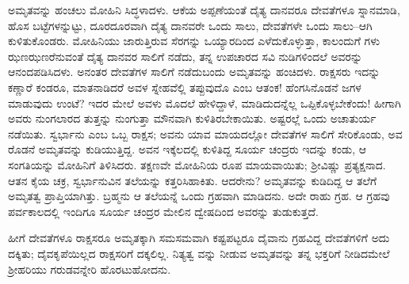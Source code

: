 ಅಮೃತವನ್ನು ಹಂಚಲು ಮೋಹಿನಿ ಸಿದ್ಧಳಾದಳು. ಆಕೆಯ ಅಪ್ಪಣೆಯಂತೆ ದೈತ್ಯ ದಾನವರೂ ದೇವತೆಗಳೂ ಸ್ನಾನಮಾಡಿ, ಹೊಸ ಬಟ್ಟೆಗಳನ್ನುಟ್ಟು, ದೂರದೂರವಾಗಿ ದೈತ್ಯ ದಾನವರೇ ಒಂದು ಸಾಲು, ದೇವತೆಗಳೇ ಒಂದು ಸಾಲು–ಆಗಿ ಕುಳಿತುಕೊಂಡರು. ಮೋಹಿನಿಯು ಜಾರುತ್ತಿರುವ ಸೆರಗನ್ನು ಒಯ್ಯಾರದಿಂದ ಎಳೆದುಕೊಳ್ಳುತ್ತಾ, ಕಾಲಂದುಗೆ ಗಳು ಝಣಝಣರೆನುವಂತೆ ದೈತ್ಯ ದಾನವರ ಸಾಲಿಗೆ ನಡೆದು, ತನ್ನ ಉಪಚಾರದ ಸವಿ ನುಡಿಗಳಿಂದಲೆ ಅವರನ್ನು ಆನಂದಪಡಿಸಿದಳು. ಅನಂತರ ದೇವತೆಗಳ ಸಾಲಿಗೆ ನಡೆದುಬಂದು ಅಮೃತವನ್ನು ಹಂಚಿದಳು. ರಾಕ್ಷಸರು ಇದನ್ನು ಕಣ್ಣಾರೆ ಕಂಡರೂ, ಮಾತನಾಡಿದರೆ ಅವಳ ಸ್ನೇಹವೆಲ್ಲಿ ತಪ್ಪುವುದೊ ಎಂಬ ಆತಂಕ! ಹೆಂಗಸಿನೊಡನೆ ಜಗಳ ಮಾಡುವುದು ಉಂಟೆ? ಇದರ ಮೇಲೆ ಅವಳು ಮೊದಲೆ ಹೇಳಿದ್ದಾಳೆ, ಮಾಡಿದುದನ್ನೆಲ್ಲ ಒಪ್ಪಿಕೊಳ್ಳಬೇಕೆಂದು! ಹೀಗಾಗಿ ಅವರು ನುಂಗಲಾರದ ತುತ್ತನ್ನು ನುಂಗುತ್ತಾ ಮೌನವಾಗಿ ಕುಳಿತಿರಬೇಕಾಯಿತು. ಅಷ್ಟರಲ್ಲೆ ಒಂದು ಅಚಾತುರ್ಯ ನಡೆಯಿತು. ಸ್ವರ್ಭಾನು ಎಂಬ ಒಬ್ಬ ರಾಕ್ಷಸ; ಅವನು ಯಾವ ಮಾಯದಲ್ಲೋ ದೇವತೆಗಳ ಸಾಲಿಗೆ ಸೇರಿಕೊಂಡು, ಅವ ರೊಡನೆ ಅಮೃತವನ್ನು ಕುಡಿಯುತ್ತಿದ್ದ. ಅವನ ಇಕ್ಕೆಲದಲ್ಲಿ ಕುಳಿತಿದ್ದ ಸೂರ್ಯ ಚಂದ್ರರು ಇದನ್ನು ಕಂಡು, ಆ ಸಂಗತಿಯನ್ನು ಮೋಹಿನಿಗೆ ತಿಳಿಸಿದರು. ತಕ್ಷಣವೇ ಮೋಹಿನಿಯ ರೂಪ ಮಾಯವಾಯಿತು; ಶ್ರೀವಿಷ್ಣು ಪ್ರತ್ಯಕ್ಷನಾದ. ಆತನ ಕೈಯ ಚಕ್ರ, ಸ್ವರ್ಭಾನುವಿನ ತಲೆಯನ್ನು ಕತ್ತರಿಸಿಹಾಕಿತು. ಆದರೇನು? ಅಮೃತವನ್ನು ಕುಡಿದಿದ್ದ ಆ ತಲೆಗೆ ಅಮೃತತ್ವ ಪ್ರಾಪ್ತಿಯಾಗಿತ್ತು. ಬ್ರಹ್ಮನು ಆ ತಲೆಯನ್ನೆ ಒಂದು ಗ್ರಹವಾಗಿ ಮಾಡಿದನು. ಅದೇ ರಾಹು ಗ್ರಹ. ಆ ಗ್ರಹವು ಪರ್ವಕಾಲದಲ್ಲಿ ಇಂದಿಗೂ ಸೂರ್ಯ ಚಂದ್ರರ ಮೇಲಿನ ದ್ವೇಷದಿಂದ ಅವರನ್ನು ತುಡುಕುತ್ತದೆ.

ಹೀಗೆ ದೇವತೆಗಳೂ ರಾಕ್ಷಸರೂ ಅಮೃತಕ್ಕಾಗಿ ಸಮಸಮವಾಗಿ ಕಷ್ಟಪಟ್ಟರೂ ದೈವಾನು ಗ್ರಹವಿದ್ದ ದೇವತೆಗಳಿಗೆ ಅದು ದಕ್ಕಿತು; ದೈವಕೃಪೆಯಿಲ್ಲದ ರಾಕ್ಷಸರಿಗೆ ದಕ್ಕಲಿಲ್ಲ. ನಿತ್ಯತ್ವ ವನ್ನು ನೀಡುವ ಅಮೃತವನ್ನು ತನ್ನ ಭಕ್ತರಿಗೆ ನೀಡಿದಮೇಲೆ ಶ್ರೀಹರಿಯು ಗರುಡವನ್ನೇರಿ ಹೊರಟುಹೋದನು.

